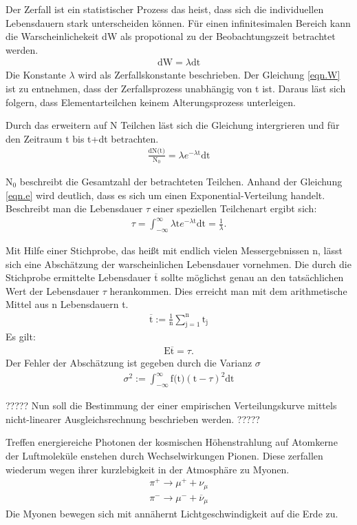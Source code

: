 Der Zerfall ist ein statistischer Prozess das heist, dass sich die individuellen Lebensdauern stark unterscheiden können.
Für einen infinitesimalen Bereich kann die Warscheinlichekeit dW als propotional zu der Beobachtungszeit betrachtet werden.
\begin{align}
  \text{dW}=\lambda \text{dt}
  \label{eqn.W}
\end{align}
Die Konstante $\lambda$ wird als Zerfallskonstante beschrieben.
Der Gleichung \ref{eqn.W} ist zu entnehmen, dass der Zerfallsprozess unabhängig von t ist.
Daraus läst sich folgern, dass Elementarteilchen keinem Alterungsprozess unterleigen.

Durch das erweitern auf N Teilchen läst sich die Gleichung intergrieren und für den Zeitraum t bis t+dt betrachten.
\begin{align}
  \frac{\text{dN(t)}}{\text{N}_0}=\lambda e^{-\lambda \text{t}} \text{dt}
  \label{eqn.e}
\end{align}



$\text{N}_0$ beschreibt die Gesamtzahl der betrachteten Teilchen.
Anhand der Gleichung \ref{eqn.e} wird deutlich, dass es sich um einen Exponential-Verteilung handelt.
Beschreibt man die Lebensdauer $\tau$ einer speziellen Teilchenart ergibt sich:
\begin{align*}
  \tau=\int_{-\infty}^{\infty}\lambda \text{t} e^{-\lambda \text{t}}\text{dt}=\frac{1}{\lambda}.
\end{align*}

Mit Hilfe einer Stichprobe, das heißt mit endlich vielen Messergebnissen n, lässt sich eine Abschätzung der warscheinlichen Lebensdauer vornehmen.
Die durch die Stichprobe ermittelte Lebensdauer $\overline{\text{t}}$ sollte möglichst genau an den tatsächlichen Wert der Lebensdauer $\tau$ herankommen.
Dies erreicht man mit dem arithmetische Mittel aus n Lebensdauern t.
\begin{align*}
  \overline{\text{t}}:=\frac{1}{\text{n}}\sum_{\text{j}=1}^\text{n}\text{t}_\text{j}
\end{align*}
Es gilt:
\begin{align*}
  \text{E}\overline{\text{t}}=\tau.
\end{align*}
Der Fehler der Abschätzung ist gegeben durch die Varianz $\sigma$
\begin{align*}
  \sigma^2:=\int_{-\infty}^{\infty}\text{f(t)}(\text{t}-\tau)^2\text{dt}
\end{align*}

?????
Nun soll die Bestimmung der einer empirischen Verteilungskurve mittels nicht-linearer Ausgleichsrechnung beschrieben werden.
?????

Treffen energiereiche Photonen der kosmischen Höhenstrahlung auf Atomkerne der Luftmoleküle enstehen durch Wechselwirkungen
Pionen.
Diese zerfallen wiederum wegen ihrer kurzlebigkeit in der Atmosphäre zu Myonen.
\begin{align*}
  \pi^+ \rightarrow \mu^++\nu_\mu\\
  \pi^- \rightarrow \mu^-+\overline{\nu}_\mu
\end{align*}
Die Myonen bewegen sich mit annähernt Lichtgeschwindigkeit auf die Erde zu.
